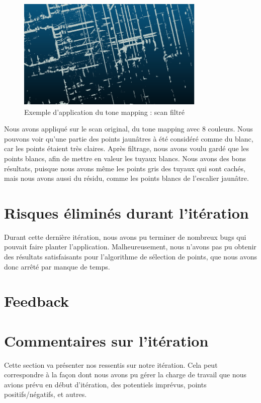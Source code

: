 \documentclass[12pt,titlepage,french]{article}
\begin{document}
\begin{figure}[H]
 \caption{\label{}  Exemple d'application du tone mapping : scan filtré}
 \begin{center}
 \includegraphics[width=0.8\textwidth]{./img/tm_example_3.PNG}
  \end{center}
\end{figure}

Nous avons appliqué sur le scan original, du tone mapping avec 8 couleurs. Nous pouvons voir qu'une partie des points jaunâtres à été considéré comme du blanc, car les points étaient très claires. Après filtrage, nous avons voulu gardé que les points blancs, afin de mettre en valeur les tuyaux blancs. Nous avons des bons résultats, puisque nous avons même les points gris des tuyaux qui sont cachés, mais nous avons aussi du résidu, comme les points blancs de l'escalier jaunâtre.

\section{Risques éliminés durant l'itération}

Durant cette dernière itération, nous avons pu terminer de nombreux bugs qui pouvait faire planter l'application. Malheureusement, nous n'avons pas pu obtenir des résultats satisfaisants pour l'algorithme de sélection de points, que nous avons donc arrêté par manque de temps.

\section{Feedback}


\section{Commentaires sur l'itération}

Cette section va présenter nos ressentis sur notre itération. Cela peut correspondre à la façon dont nous avons pu gérer la charge de travail que nous avions prévu en début d'itération, des potentiels imprévus, points positifs/négatifs, et autres.
\end{document}

